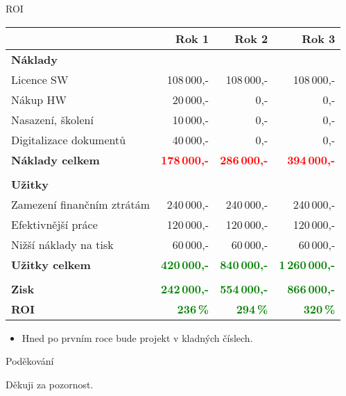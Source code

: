 \documentclass[10pt]{beamer}
\begin{document}
\begin{frame}{ROI} 
  \begin{center} \footnotesize
    \begin{tabular}{ | l | r | r | r | }
          \hline
          & \textbf{Rok 1} & \textbf{Rok 2} & \textbf{Rok 3} \\
          \hline \hline
          \textbf{Náklady} & & & \\
          \hline
          Licence SW & 108\,000,- & 108\,000,- & 108\,000,- \\
          \hline
          Nákup HW & 20\,000,- & 0,- & 0,- \\
          \hline
          Nasazení, školení & 10\,000,- & 0,- & 0,- \\
          \hline
          Digitalizace dokumentů & 40\,000,- & 0,- & 0,-\\
          \hline \hline 
          \textbf{Náklady celkem} & \textbf{\textcolor{red}{178\,000,-}} & \textbf{\textcolor{red}{286\,000,-}} & 
                                    \textbf{\textcolor{red}{394\,000,-}} \\
          \hline
          \multicolumn{4}{r}{} \\
          \hline
          \textbf{Užitky} & & &\\
          \hline
          Zamezení finančním ztrátám  & 240\,000,- & 240\,000,- & 240\,000,- \\
          \hline
          Efektivnější práce & 120\,000,- & 120\,000,- & 120\,000,- \\
          \hline
          Nižší náklady na tisk  & 60\,000,- & 60\,000,- & 60\,000,- \\
          \hline \hline
          \textbf{Užitky celkem} & \textbf{\textcolor{green}{420\,000,-}} & \textbf{\textcolor{green}{840\,000,-}} & 
                              \textbf{\textcolor{green}{1\,260\,000,-}} \\ 
          \hline 
          \multicolumn{4}{r}{} \\
          \hline
          \textbf{Zisk}  & \textbf{\textcolor{green}{242\,000,-}} & \textbf{\textcolor{green}{554\,000,-}} & 
                              \textbf{\textcolor{green}{866\,000,-}} \\
          \hline
          \textbf{ROI}  & \textbf{\textcolor{green}{236\,\%}} & \textbf{\textcolor{green}{294\,\%}} & 
                          \textbf{\textcolor{green}{320\,\%}} \\
          \hline
        \end{tabular}
    \end{center}
    
    \begin{itemize}
			\item Hned po prvním roce bude projekt v kladných číslech.
		\end{itemize}
\end{frame}

\begin{frame}{Poděkování}
	\begin{block}{Děkuji za pozornost.}
	\end{block}
\end{frame}
\end{document}
